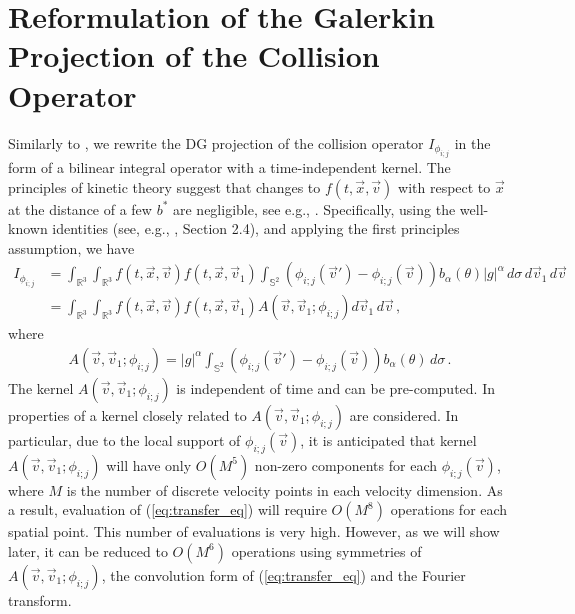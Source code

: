 \documentclass[12pt]{CSUNthesis}
\def\R{\mathbb{R}}
\def\R{\mathbb{R}}
\def\Sbb{\mathbb{S}}
\newcommand{\vecx}{\vec{x}}
\newcommand{\vecv}{\vec{v}}
\begin{document}
\section{Reformulation of the Galerkin Projection of the Collision Operator}
\label{sec:reform_galerkin}
Similarly to \cite{AlekseenkoJosyula2012,AlekseenkoJosyula2012a,Majorana2011}, we rewrite the 
DG projection of the collision operator $I_{\phi_{i;j}}$ in the form of a bilinear integral operator 
with a time-independent kernel. The principles of kinetic theory suggest that changes to $f(t,\vecx, \vecv)$ with respect to $\vecx$ at the distance of a few $b^*$ are negligible, see e.g., \cite{Struchtrup2005}. Specifically, using the well-known identities (see, e.g.,  \cite{Kogan1969}, Section 2.4), and applying the first principles assumption, we have 
\begin{align}
\label{eq:transfer_eq}
I_{\phi_{i;j}}&= \int_{\R^3}\int_{\R^3} f(t,\vec{x},\vec{v}) f(t,\vec{x},\vec{v}_{1})
\int_{\Sbb^2}(\phi_{i;j}(\vec{v}')-\phi_{i;j}(\vec{v})) b_{\alpha}(\theta) |g|^\alpha \, d\sigma\,
 d\vec{v}_{1}\, d\vec{v} \nonumber \\
{} & = \int_{\R^3}\int_{\R^3} f(t,\vec{x},\vec{v}) f(t,\vec{x},\vec{v}_{1})
 A(\vec{v},\vec{v}_{1};\phi_{i;j})   d\vec{v}_{1}\, d\vec{v}\, ,
\end{align}
where  
\begin{align}
\label{eq:A_definition}
A(\vec{v},\vec{v}_{1};\phi_{i;j})= |g|^\alpha \int_{\Sbb^2} (\phi_{i;j}(\vec{v}')
- \phi_{i;j}(\vec{v})) b_{\alpha}(\theta) \, d\sigma\, .
\end{align}
The kernel $A(\vec{v},\vec{v}_{1};\phi_{i;j})$ is independent of time and can be pre-computed. 
In \cite{AlekseenkoJosyula2012a} properties of a kernel closely related to $A(\vec{v},\vec{v}_{1};\phi_{i;j})$ 
are considered.
In particular, due to the local support of $\phi_{i;j}(\vec{v})$, it is anticipated that 
kernel  $A(\vec{v},\vec{v}_{1};\phi_{i;j})$ will have only $O(M^{5})$ non-zero components for each $\phi_{i;j}(\vec{v})$, 
where $M$ is the number of discrete velocity points in each velocity dimension. As a result, evaluation of  
(\ref{eq:transfer_eq}) will require $O(M^{8})$ operations for each spatial point. This number of evaluations 
is very high. However, as we will show later, it can be reduced to $O(M^6)$ operations using symmetries of
$A(\vec{v},\vec{v}_{1};\phi_{i;j})$, the convolution form of (\ref{eq:transfer_eq}) and the Fourier 
transform. 
\end{document}
